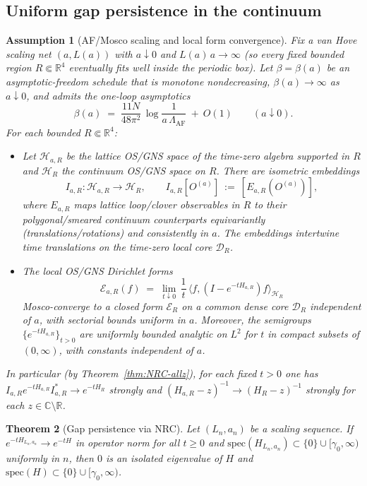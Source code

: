\documentclass[11pt]{amsart}
\theoremstyle{plain}
\newtheorem{theorem}{Theorem}[section]
\newtheorem{assumption}[theorem]{Assumption}
\theoremstyle{definition}
\theoremstyle{remark}
\begin{document}
\subsection*{Uniform gap persistence in the continuum}

\begin{assumption}[AF/Mosco scaling and local form convergence]\label{assump:AF-Mosco}
Fix a van Hove scaling net $(a,L(a))$ with $a\downarrow 0$ and $L(a)\,a\to\infty$ (so every fixed bounded region $R\Subset\mathbb R^4$ eventually fits well inside the periodic box). Let $\beta=\beta(a)$ be an asymptotic-freedom schedule that is monotone nondecreasing, $\beta(a)\to\infty$ as $a\downarrow 0$, and admits the one-loop asymptotics
\[
  \beta(a)\;=\; \frac{11N}{48\pi^2}\,\log\frac{1}{a\,\Lambda_{\mathrm{AF}}}\ +\ O(1)\qquad (a\downarrow 0).
\]
For each bounded $R\Subset\mathbb R^4$:
\begin{itemize}
  \item[(i)] Let $\mathcal H_{a,R}$ be the lattice OS/GNS space of the time-zero algebra supported in $R$ and $\mathcal H_R$ the continuum OS/GNS space on $R$. There are isometric embeddings
  \[
    I_{a,R}:\mathcal H_{a,R}\to\mathcal H_R,\qquad I_{a,R}[O^{(a)}]\ :=\ [E_{a,R}(O^{(a)})],
  \]
  where $E_{a,R}$ maps lattice loop/clover observables in $R$ to their polygonal/smeared continuum counterparts equivariantly (translations/rotations) and consistently in $a$. The embeddings intertwine time translations on the time-zero local core $\mathcal D_R$.
  \item[(ii)] The local OS/GNS Dirichlet forms
  \[
    \mathcal E_{a,R}(f)\;=\; \lim_{t\downarrow 0}\,\frac{1}{t}\,\langle f,(I-e^{-tH_{a,R}})f\rangle_{\mathcal H_R}
  \]
  Mosco-converge to a closed form $\mathcal E_R$ on a common dense core $\mathcal D_R$ independent of $a$, with sectorial bounds uniform in $a$. Moreover, the semigroups $\{e^{-t H_{a,R}}\}_{t>0}$ are uniformly bounded analytic on $L^2$ for $t$ in compact subsets of $(0,\infty)$, with constants independent of $a$.
\end{itemize}
In particular (by Theorem~\ref{thm:NRC-allz}), for each fixed $t>0$ one has $I_{a,R}e^{-tH_{a,R}}I_{a,R}^*\to e^{-tH_R}$ strongly and $(H_{a,R}-z)^{-1}\to (H_R-z)^{-1}$ strongly for each $z\in\mathbb C\setminus\mathbb R$.
\end{assumption}
\begin{theorem}[Gap persistence via NRC]\label{thm:gap-persist}
Let $(L_n,a_n)$ be a scaling sequence. If $e^{-tH_{L_n,a_n}}\to e^{-tH}$ in operator norm for all $t\ge 0$ and $\mathrm{spec}(H_{L_n,a_n})\subset\{0\}\cup[\gamma_0,\infty)$ uniformly in $n$, then $0$ is an isolated eigenvalue of $H$ and $\mathrm{spec}(H)\subset\{0\}\cup[\gamma_0,\infty)$.
\end{theorem}
\end{document}
